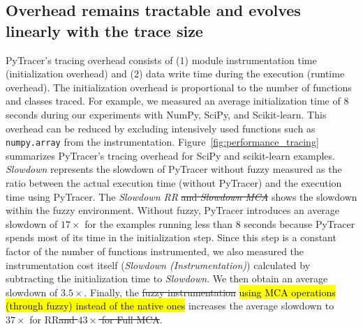 \documentclass[10pt,journal,compsoc]{IEEEtran}
\newcommand{\pytracer}[0]{PyTracer\xspace}
\DeclareRobustCommand{\add}[1]{\sethlcolor{lightgreen}\hl{#1}}
\DeclareRobustCommand{\remove}[1]{\textcolor{lightred}{\sout{#1}}}
\begin{document}
\subsection{Overhead remains tractable and evolves linearly with the trace size}

\pytracer's tracing overhead consists of (1) module instrumentation time
(initialization overhead) and (2) data write time during the execution (runtime
overhead). The initialization overhead is proportional to the number of
functions and classes traced. For example, we measured an average initialization
time of 8 seconds during our experiments with  NumPy, SciPy, and Scikit-learn.
This overhead can be reduced by excluding intensively used functions such as
\texttt{numpy.array} from the instrumentation.
Figure~\ref{fig:performance_tracing} summarizes \pytracer's tracing overhead for
SciPy and scikit-learn examples. \textit{Slowdown} represents the slowdown of
\pytracer without fuzzy measured as the ratio between the actual execution time
(without \pytracer) and the execution time using \pytracer. The \textit{Slowdown
    RR} \remove{and \textit{Slowdown MCA}} shows the slowdown within the fuzzy environment.
Without fuzzy, \pytracer introduces an average slowdown of $17\times$ for
the examples running less than 8 seconds because \pytracer spends most of its
time in the initialization step. Since this step is a constant factor of the
number of functions instrumented, we also measured the instrumentation cost
itself (\textit{Slowdown (Instrumentation)}) calculated by subtracting the
initialization time to \textit{Slowdown}. We then obtain an average slowdown of
$3.5\times$. Finally, the \remove{fuzzy instrumentation} \add{using MCA
    operations (through fuzzy) instead of the native ones} increases the average
slowdown to $37\times$ for RR\remove{and $43\times$ for Full MCA}.

\end{document}
